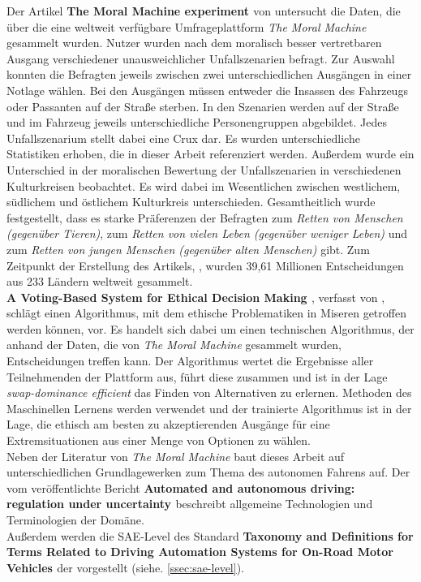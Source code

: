 Der Artikel \textbf{The Moral Machine experiment \cite{moralMachine}} von \citeauthor{moralMachine} untersucht die Daten, die über die eine weltweit verfügbare Umfrageplattform \textit{The Moral Machine} gesammelt wurden. Nutzer wurden nach dem moralisch besser vertretbaren Ausgang verschiedener unausweichlicher Unfallszenarien befragt. Zur Auswahl konnten die Befragten jeweils zwischen zwei unterschiedlichen Ausgängen in einer Notlage wählen. Bei den Ausgängen müssen entweder die Insassen des Fahrzeugs oder Passanten auf der Straße sterben. In den Szenarien werden auf der Straße und im Fahrzeug jeweils unterschiedliche Personengruppen abgebildet. Jedes Unfallszenarium stellt dabei eine Crux dar. Es wurden unterschiedliche Statistiken erhoben, die in dieser Arbeit referenziert werden. Außerdem wurde ein Unterschied in der moralischen Bewertung der Unfallszenarien in verschiedenen Kulturkreisen beobachtet. Es wird dabei im Wesentlichen zwischen westlichem, südlichem und östlichem Kulturkreis unterschieden. Gesamtheitlich wurde festgestellt, dass es starke Präferenzen der Befragten zum \textit{Retten von Menschen (gegenüber Tieren)}, zum \textit{Retten von vielen Leben (gegenüber weniger Leben)} und zum \textit{Retten von jungen Menschen (gegenüber alten Menschen)} gibt. Zum Zeitpunkt der Erstellung des Artikels, \citeyear{moralMachine}, wurden 39,61 Millionen Entscheidungen aus 233 Ländern weltweit gesammelt. \\

\textbf{A Voting-Based System for Ethical Decision Making \cite{votingBasedSystem}}, verfasst von \citeauthor{votingBasedSystem}, schlägt einen Algorithmus, mit dem ethische Problematiken in Miseren getroffen werden können, vor. Es handelt sich dabei um einen technischen Algorithmus, der anhand der Daten, die von \textit{The Moral Machine} gesammelt wurden, Entscheidungen treffen kann. Der Algorithmus wertet die Ergebnisse aller Teilnehmenden der Plattform aus, führt diese zusammen und ist in der Lage  \textit{swap-dominance efficient} das Finden von Alternativen zu erlernen. Methoden des Maschinellen Lernens werden verwendet und der trainierte Algorithmus ist in der Lage, die ethisch am besten zu akzeptierenden Ausgänge für eine Extremsituationen aus einer Menge von Optionen zu wählen.\\

Neben der Literatur von \textit{The Moral Machine} baut dieses Arbeit auf unterschiedlichen Grundlagewerken zum Thema des autonomen Fahrens auf. Der vom \citeauthor{smith2015automated} veröffentlichte Bericht \textbf{Automated and
autonomous driving: regulation under uncertainty \cite{smith2015automated}} beschreibt allgemeine Technologien und Terminologien der Domäne.\\

Außerdem werden die SAE-Level des Standard \textbf{Taxonomy and Definitions for Terms Related to Driving Automation Systems for On-Road Motor Vehicles \cite{standardSAE}} der \citeauthor{standardSAE} vorgestellt (siehe. \ref{ssec:sae-level}).\\